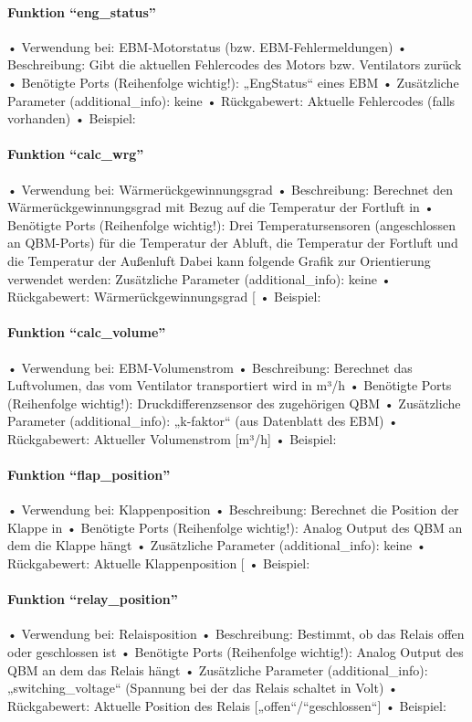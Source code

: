 \paragraph{Funktion \enquote{eng\_status}}
• Verwendung bei: EBM-Motorstatus (bzw. EBM-Fehlermeldungen)
• Beschreibung: Gibt die aktuellen Fehlercodes des Motors bzw. Ventilators zurück
• Benötigte Ports (Reihenfolge wichtig!): „EngStatus“ eines EBM
• Zusätzliche Parameter (additional\_info): keine
• Rückgabewert: Aktuelle Fehlercodes (falls vorhanden)
• Beispiel:

\paragraph{Funktion \enquote{calc\_wrg}}
• Verwendung bei: Wärmerückgewinnungsgrad
• Beschreibung: Berechnet den Wärmerückgewinnungsgrad mit Bezug auf die Temperatur der Fortluft in %
• Benötigte Ports (Reihenfolge wichtig!): Drei Temperatursensoren (angeschlossen an QBM-Ports) für die Temperatur der Abluft, die Temperatur der Fortluft und die Temperatur der Außenluft Dabei kann folgende Grafik zur Orientierung verwendet werden:
Zusätzliche Parameter (additional\_info): keine
• Rückgabewert: Wärmerückgewinnungsgrad [%
• Beispiel:

\paragraph{Funktion \enquote{calc\_volume}}
• Verwendung bei: EBM-Volumenstrom
• Beschreibung: Berechnet das Luftvolumen, das vom Ventilator transportiert wird in m³/h
• Benötigte Ports (Reihenfolge wichtig!): Druckdifferenzsensor des zugehörigen QBM
• Zusätzliche Parameter (additional\_info): „k-faktor“ (aus Datenblatt des EBM)
• Rückgabewert: Aktueller Volumenstrom [m³/h]
• Beispiel:

\paragraph{Funktion \enquote{flap\_position}}
• Verwendung bei: Klappenposition
• Beschreibung: Berechnet die Position der Klappe in %
• Benötigte Ports (Reihenfolge wichtig!): Analog Output des QBM an dem die Klappe hängt
• Zusätzliche Parameter (additional\_info): keine
• Rückgabewert: Aktuelle Klappenposition [%
• Beispiel:

\paragraph{Funktion \enquote{relay\_position}}
• Verwendung bei: Relaisposition
• Beschreibung: Bestimmt, ob das Relais offen oder geschlossen ist
• Benötigte Ports (Reihenfolge wichtig!): Analog Output des QBM an dem das Relais hängt
• Zusätzliche Parameter (additional\_info): „switching\_voltage“ (Spannung bei der das Relais schaltet in Volt)
• Rückgabewert: Aktuelle Position des Relais [„offen“/“geschlossen“]
• Beispiel: